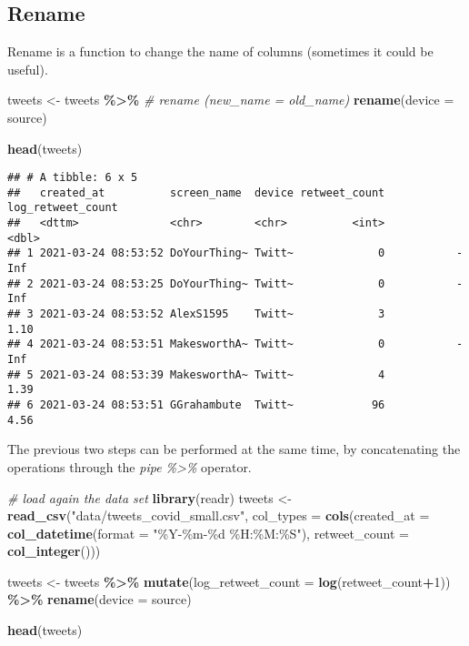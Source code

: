 \documentclass[
]{article}
\newenvironment{Shaded}{\begin{snugshade}}{\end{snugshade}}
\newcommand{\AttributeTok}[1]{\textcolor[rgb]{0.13,0.29,0.53}{#1}}
\newcommand{\CommentTok}[1]{\textcolor[rgb]{0.56,0.35,0.01}{\textit{#1}}}
\newcommand{\DecValTok}[1]{\textcolor[rgb]{0.00,0.00,0.81}{#1}}
\newcommand{\FunctionTok}[1]{\textcolor[rgb]{0.13,0.29,0.53}{\textbf{#1}}}
\newcommand{\NormalTok}[1]{#1}
\newcommand{\OtherTok}[1]{\textcolor[rgb]{0.56,0.35,0.01}{#1}}
\newcommand{\SpecialCharTok}[1]{\textcolor[rgb]{0.81,0.36,0.00}{\textbf{#1}}}
\newcommand{\StringTok}[1]{\textcolor[rgb]{0.31,0.60,0.02}{#1}}
\begin{document}
\subsection{Rename}\label{rename}

Rename is a function to change the name of columns (sometimes it could be useful).

\begin{Shaded}
\begin{Highlighting}[]
\NormalTok{tweets }\OtherTok{\textless{}{-}}\NormalTok{ tweets }\SpecialCharTok{\%\textgreater{}\%}
  \CommentTok{\# rename (new\_name = old\_name)}
  \FunctionTok{rename}\NormalTok{(}\AttributeTok{device =}\NormalTok{ source)}

\FunctionTok{head}\NormalTok{(tweets)}
\end{Highlighting}
\end{Shaded}

\begin{verbatim}
## # A tibble: 6 x 5
##   created_at          screen_name  device retweet_count log_retweet_count
##   <dttm>              <chr>        <chr>          <int>             <dbl>
## 1 2021-03-24 08:53:52 DoYourThing~ Twitt~             0           -Inf   
## 2 2021-03-24 08:53:25 DoYourThing~ Twitt~             0           -Inf   
## 3 2021-03-24 08:53:52 AlexS1595    Twitt~             3              1.10
## 4 2021-03-24 08:53:51 MakesworthA~ Twitt~             0           -Inf   
## 5 2021-03-24 08:53:39 MakesworthA~ Twitt~             4              1.39
## 6 2021-03-24 08:53:51 GGrahambute  Twitt~            96              4.56
\end{verbatim}

The previous two steps can be performed at the same time, by concatenating the operations through the \emph{pipe \%\textgreater\%} operator.

\begin{Shaded}
\begin{Highlighting}[]
\CommentTok{\# load again the data set}
\FunctionTok{library}\NormalTok{(readr)}
\NormalTok{tweets }\OtherTok{\textless{}{-}} \FunctionTok{read\_csv}\NormalTok{(}\StringTok{"data/tweets\_covid\_small.csv"}\NormalTok{, }
    \AttributeTok{col\_types =} \FunctionTok{cols}\NormalTok{(}\AttributeTok{created\_at =} \FunctionTok{col\_datetime}\NormalTok{(}\AttributeTok{format =} \StringTok{"\%Y{-}\%m{-}\%d \%H:\%M:\%S"}\NormalTok{), }
        \AttributeTok{retweet\_count =} \FunctionTok{col\_integer}\NormalTok{()))}

\NormalTok{tweets }\OtherTok{\textless{}{-}}\NormalTok{ tweets }\SpecialCharTok{\%\textgreater{}\%}
  \FunctionTok{mutate}\NormalTok{(}\AttributeTok{log\_retweet\_count =} \FunctionTok{log}\NormalTok{(retweet\_count}\SpecialCharTok{+}\DecValTok{1}\NormalTok{)) }\SpecialCharTok{\%\textgreater{}\%}
  \FunctionTok{rename}\NormalTok{(}\AttributeTok{device =}\NormalTok{ source)}

\FunctionTok{head}\NormalTok{(tweets)}
\end{Highlighting}
\end{Shaded}
\end{document}
